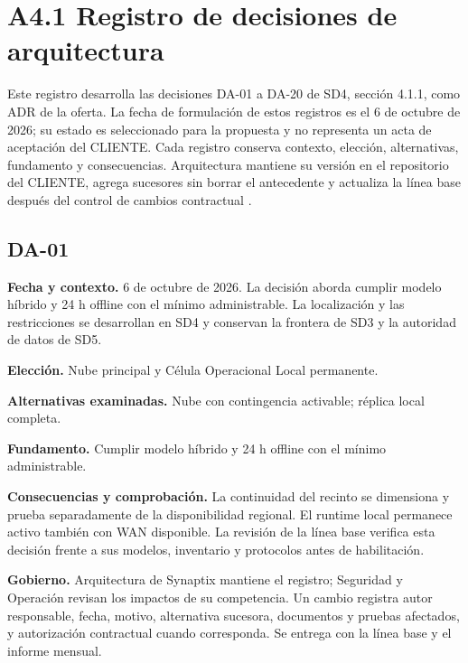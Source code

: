 \documentclass[11pt,letterpaper]{report}
\begin{document}
\tableofcontents
\clearpage
\chapter*{A4.1 Registro de decisiones de arquitectura}
\label{anexo:adr-arquitectura}

Este registro desarrolla las decisiones DA-01 a DA-20 de SD4, sección 4.1.1, como ADR de la oferta. La fecha de formulación de estos registros es el 6 de octubre de 2026; su estado es seleccionado para la propuesta y no representa un acta de aceptación del CLIENTE. Cada registro conserva contexto, elección, alternativas, fundamento y consecuencias. Arquitectura mantiene su versión en el repositorio del CLIENTE, agrega sucesores sin borrar el antecedente y actualiza la línea base después del control de cambios contractual \parencites{iso42010}[RT-02.04, p.~7]{pucv-transversal}.

\section*{DA-01}

\textbf{Fecha y contexto.} 6 de octubre de 2026. La decisión aborda cumplir modelo híbrido y 24 h offline con el mínimo administrable. La localización y las restricciones se desarrollan en SD4 y conservan la frontera de SD3 y la autoridad de datos de SD5.

\textbf{Elección.} Nube principal y Célula Operacional Local permanente.

\textbf{Alternativas examinadas.} Nube con contingencia activable; réplica local completa.

\textbf{Fundamento.} Cumplir modelo híbrido y 24 h offline con el mínimo administrable.

\textbf{Consecuencias y comprobación.} La continuidad del recinto se dimensiona y prueba separadamente de la disponibilidad regional. El runtime local permanece activo también con WAN disponible. La revisión de la línea base verifica esta decisión frente a sus modelos, inventario y protocolos antes de habilitación.

\textbf{Gobierno.} Arquitectura de Synaptix mantiene el registro; Seguridad y Operación revisan los impactos de su competencia. Un cambio registra autor responsable, fecha, motivo, alternativa sucesora, documentos y pruebas afectados, y autorización contractual cuando corresponda. Se entrega con la línea base y el informe mensual.
\end{document}
